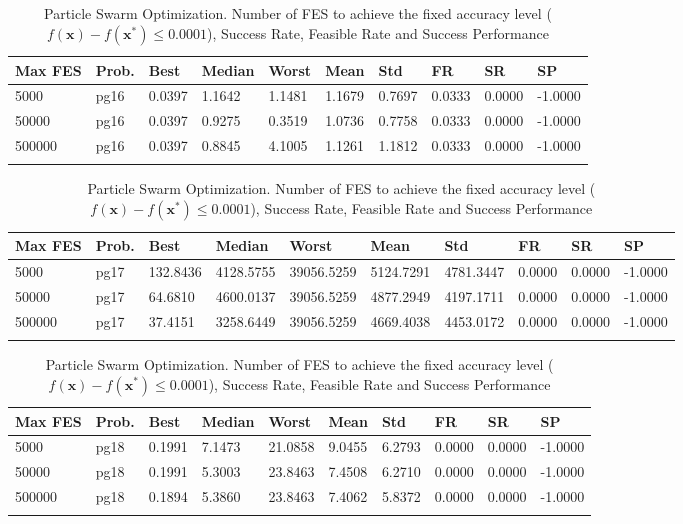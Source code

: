\documentclass[10pt, a4paper]{book}
\begin{document}
\begin{center}
\begin{longtable}{l l l l l l l l l l}
\textbf{Max FES} & \textbf{Prob.} & \textbf{Best} & \textbf{Median} & \textbf{Worst} & \textbf{Mean} & \textbf{Std} & \textbf{FR} & \textbf{SR} & \textbf{SP} \\
\hline
5000 & pg16 & 0.0397 & 1.1642 & 1.1481 & 1.1679 & 0.7697 & 0.0333 & 0.0000 & -1.0000 \\
50000 & pg16 & 0.0397 & 0.9275 & 0.3519 & 1.0736 & 0.7758 & 0.0333 & 0.0000 & -1.0000 \\
500000 & pg16 & 0.0397 & 0.8845 & 4.1005 & 1.1261 & 1.1812 & 0.0333 & 0.0000 & -1.0000 \\

\caption{ Particle Swarm Optimization. Number of FES to achieve the fixed accuracy level ($f(\mathbf{x}) - f(\mathbf{x}^{*}) \leq 0.0001$), Success Rate, Feasible Rate and Success Performance }
\end{longtable}
\end{center}

\begin{center}
\begin{longtable}{l l l l l l l l l l}
\textbf{Max FES} & \textbf{Prob.} & \textbf{Best} & \textbf{Median} & \textbf{Worst} & \textbf{Mean} & \textbf{Std} & \textbf{FR} & \textbf{SR} & \textbf{SP} \\
\hline
5000 & pg17 & 132.8436 & 4128.5755 & 39056.5259 & 5124.7291 & 4781.3447 & 0.0000 & 0.0000 & -1.0000 \\
50000 & pg17 & 64.6810 & 4600.0137 & 39056.5259 & 4877.2949 & 4197.1711 & 0.0000 & 0.0000 & -1.0000 \\
500000 & pg17 & 37.4151 & 3258.6449 & 39056.5259 & 4669.4038 & 4453.0172 & 0.0000 & 0.0000 & -1.0000 \\

\caption{ Particle Swarm Optimization. Number of FES to achieve the fixed accuracy level ($f(\mathbf{x}) - f(\mathbf{x}^{*}) \leq 0.0001$), Success Rate, Feasible Rate and Success Performance }
\end{longtable}
\end{center}

\begin{center}
\begin{longtable}{l l l l l l l l l l}
\textbf{Max FES} & \textbf{Prob.} & \textbf{Best} & \textbf{Median} & \textbf{Worst} & \textbf{Mean} & \textbf{Std} & \textbf{FR} & \textbf{SR} & \textbf{SP} \\
\hline
5000 & pg18 & 0.1991 & 7.1473 & 21.0858 & 9.0455 & 6.2793 & 0.0000 & 0.0000 & -1.0000 \\
50000 & pg18 & 0.1991 & 5.3003 & 23.8463 & 7.4508 & 6.2710 & 0.0000 & 0.0000 & -1.0000 \\
500000 & pg18 & 0.1894 & 5.3860 & 23.8463 & 7.4062 & 5.8372 & 0.0000 & 0.0000 & -1.0000 \\

\caption{ Particle Swarm Optimization. Number of FES to achieve the fixed accuracy level ($f(\mathbf{x}) - f(\mathbf{x}^{*}) \leq 0.0001$), Success Rate, Feasible Rate and Success Performance }
\end{longtable}
\end{center}
\end{document}
